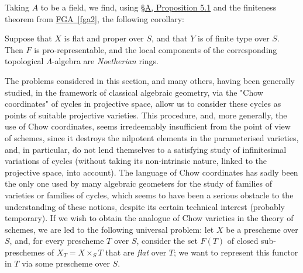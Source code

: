   Taking \(A\) to be a field, we find, using \hyperref[fga3.ii-a.5-proposition-5.1]{§A, Proposition 5.1} and the finiteness theorem from \hyperref[fga2]{FGA~\ref*{fga2}}, the following corollary:\begin{corollary}{}\label{fga3.ii-c.2-proposition-2.1-corollary}\skipsinglepar\par{}Suppose that \(X\) is flat and proper over \(S\), and that \(Y\) is of finite type over \(S\).
    Then \(F\) is pro-representable, and the local components of the corresponding topological \(\Lambda \)-algebra are \emph{Noetherian} rings.\end{corollary}\begin{remarks}{}\label{fga3.ii-c.2-remarks}\skipsinglepar\par{}The problems considered in this section, and many others, having been generally studied, in the framework of classical algebraic geometry, via the "Chow coordinates" of cycles in projective space, allow us to consider these cycles as points of suitable projective varieties.
    This procedure, and, more generally, the use of Chow coordinates, seems irredeemably insufficient from the point of view of schemes, since it destroys the nilpotent elements in the parameterised varieties, and, in particular, do not lend themselves to a satisfying study of infinitesimal variations of cycles (without taking its non-intrinsic nature, linked to the projective space, into account).
    The language of Chow coordinates has sadly been the only one used by many algebraic geometers for the study of families of varieties or families of cycles, which seems to have been a serious obstacle to the understanding of these notions, despite its certain technical interest (probably temporary).
    If we wish to obtain the analogue of Chow varieties in the theory of schemes, we are led to the following universal problem:
    let \(X\) be a prescheme over \(S\), and, for every prescheme \(T\) over \(S\), consider the set \(F(T)\) of closed sub-preschemes of \(X_T=X\times _S T\) that are \emph{flat} over \(T\); we want to represent this functor in \(T\) via some prescheme over \(S\).
    

\end{remarks}
